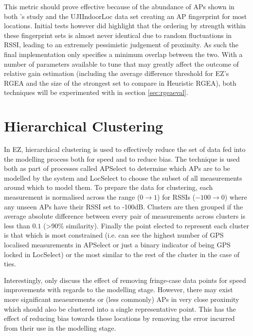 \documentclass{UoYCSproject}
\begin{document}
            This metric should prove effective because of the abundance of APs shown in both \citeauthor{chintalapudi2010indoor}'s study \citep{chintalapudi2010indoor} and the UJIIndoorLoc data set \citep{torres2014ujiindoorloc} creating an AP fingerprint for most locations. Initial tests however did highlight that the ordering by strength within these fingerprint sets is almost never identical due to random fluctuations in RSSI, leading to an extremely pessimistic judgement of proximity. As such the final implementation only specifies a minimum overlap between the two. With a number of parameters available to tune that may greatly affect the outcome of relative gain estimation (including the average difference threshold for EZ's RGEA and the size of the strongest set to compare in Heuristic RGEA), both techniques will be experimented with in section \ref{sec:rgeaeval}.
		
		\section{Hierarchical Clustering}
        \label{sec:datacluster}
        
	        In EZ, hierarchical clustering is used to effectively reduce the set of data fed into the modelling process both for speed and to reduce bias. The technique is used both as part of processes called APSelect to determine which APs are to be modelled by the system and LocSelect to choose the subset of all measurements around which to model them. To prepare the data for clustering, each measurement is normalised across the range ($0 \rightarrow 1$) for RSSIs ($-100 \rightarrow 0$) where any unseen APs have their RSSI set to -100dB. Clusters are then grouped if the average absolute difference between every pair of measurements across clusters is less than $0.1$ (>90\% similarity). Finally the point elected to represent each cluster is that which is most constrained (i.e. can see the highest number of GPS localised measurements in APSelect or just a binary indicator of being GPS locked in LocSelect) or the most similar to the rest of the cluster in the case of ties.
	        
	        Interestingly, \citet{chintalapudi2010indoor} only discuss the effect of removing fringe-case data points for speed improvements with regards to the modelling stage. However, there may exist more significant measurements or (less commonly) APs in very close proximity which should also be clustered into a single representative point. This has the effect of reducing bias towards these locations by removing the error incurred from their use in the modelling stage.
	        
\end{document}
